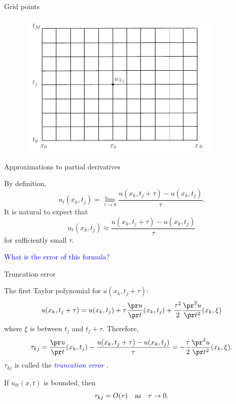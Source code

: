 \documentclass{beamer}
\begin{document}
\begin{frame}{Grid points}

\begin{figure}[h]
\centering
\includegraphics[width=10cm,height=7cm]{../Lecture_notes/basic_grid2.pdf}
\end{figure}

\vskip 10mm

\end{frame}



\begin{frame}{Approximations to partial derivatives}

By definition,
\[
u_{t}(x_k,t_j)=\lim_{\tau\to 0}\frac{u(x_k,t_j+\tau)-u(x_k,t_j)}{\tau}.
\]
It is natural to expect that
\[
u_{t}(x_k,t_j)\approx \frac{u(x_k,t_j+\tau)-u(x_k,t_j)}{\tau}
\]
for sufficiently small $\tau$.

\vskip 5mm
\textcolor{blue}{What is the error of this formula?}

\end{frame}



\begin{frame}{Truncation error}

The first Taylor polynomial for $u(x_k,t_j+\tau)$:
\[
u(x_k,t_j+\tau)=u(x_k,t_j)+\tau \frac{\pr u}{\pr t}(x_k,t_j)+
\frac{\tau^2}{2}\frac{\pr^2 u}{\pr t^2}(x_k,\xi)
\]
where $\xi$ is between $t_j$ and $t_j+\tau$. Therefore,
\[
\tau_{kj}=\frac{\pr u}{\pr t}(x_k,t_j)-\frac{u(x_k,t_j+\tau)-u(x_k,t_j)}{\tau}=
-\frac{\tau}{2}\frac{\pr^2 u}{\pr t^2}(x_k,\xi).
\]
$\tau_{kj}$ is called the \textcolor{blue}{{\em truncation error }}.

\vskip 5mm
If $u_{tt}(x,t)$ is bounded, then
\[
\tau_{kj}=O(\tau) \quad {\rm as} \quad \tau\to 0.
\]

\end{frame}
\end{document}
